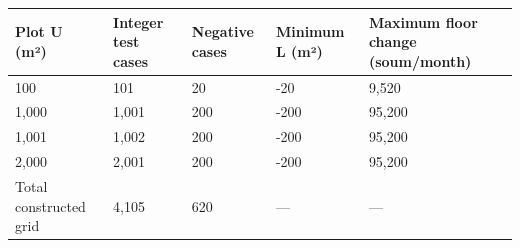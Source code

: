 \begingroup\fontsize{11}{13.2}\selectfont
\begin{longtable}{p{} p{} p{} p{} p{}}
\toprule
Plot U (m²) & Integer test cases & Negative cases & Minimum L (m²) & Maximum floor change (soum/month) \\
\midrule
\endhead
100 & 101 & 20 & -20 & 9,520 \\
1,000 & 1,001 & 200 & -200 & 95,200 \\
1,001 & 1,002 & 200 & -200 & 95,200 \\
2,000 & 2,001 & 200 & -200 & 95,200 \\
Total constructed grid & 4,105 & 620 & — & — \\
\bottomrule
\end{longtable}
\endgroup
